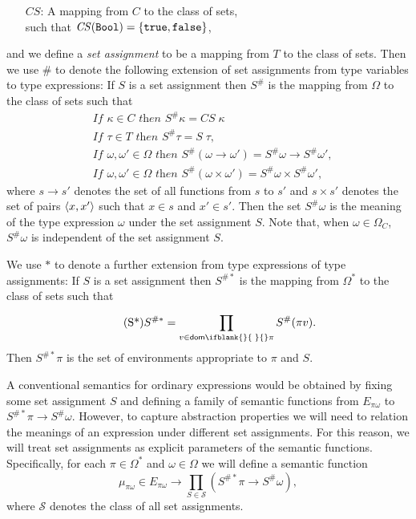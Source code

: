 \documentclass[sigplan,screen,nonacm,balance=false]{acmart}
\theoremstyle{plain}
\DeclarePairedDelimiter{\set}{\{}{\}}
\DeclarePairedDelimiter{\pair}{\langle}{\rangle}
\newcommand{\Bool}{\mathtt{Bool}}
\newcommand{\true}{\mathtt{true}}
\newcommand{\false}{\mathtt{false}}
\newcommand{\dom}[1]{\mathsf{dom}\ifblank{#1}{\;}{#1}}
\newcommand{\CS}{\mathit{CS}}
\begin{document}
\begin{itemize}[noitemsep,leftmargin=3em]
  \item[$\CS$:] A mapping from $C$ to the class of sets, \\
  such that $\CS(\Bool) = \set{\true, \false}$,
\end{itemize}
%
and we define a \emph{set assignment} to be a mapping from $T$ to the class of sets.
Then we use $\#$ to denote the following extension of set assignments from type variables to type expressions:
If $S$ is a set assignment then $S^\#$ is the mapping from $\Omega$ to the class of sets such that
%
\begin{align}
  \tag{S1}
  &\textit{If } \kappa \in C \textit{ then } S^\# \kappa = \CS \; \kappa \\
  \tag{S2}
  &\textit{If } \tau \in T \textit{ then } S^\# \tau = S \; \tau, \\
  \tag{S3}
  &\textit{If } \omega, \omega' \in \Omega \textit{ then } S^\# (\omega \to \omega') = S^\# \omega \to S^\# \omega', \\
  \tag{S4}\label{S4}
  &\textit{If } \omega, \omega' \in \Omega \textit{ then } S^\#(\omega \times \omega') = S^\# \omega \times S^\# \omega',
\end{align}
%
where $s \to s'$ denotes the set of all functions from $s$ to $s'$ and $s \times s'$ denotes the set of pairs $\pair{x, x'}$ such that $x \in s$ and $x' \in s'$.
Then the set $S^\# \omega$ is the meaning of the type expression $\omega$ under the set assignment $S$.
Note that, when $\omega \in \Omega_C$, $S^\# \omega$ is independent of the set assignment $S$.

We use $*$ to denote a further extension from type expressions of type assignments:
If $S$ is a set assignment then $S^{\#*}$ is the mapping from $\Omega^*$ to the class of sets such that
%
\begin{equation}\tag{S*}\label{S-star}
  S^{\#*} = \prod_{v \in \dom{} \pi}^{} S^\#(\pi v).
\end{equation}
%
Then $S^{\#*} \pi$ is the set of environments appropriate to $\pi$ and $S$.

A conventional semantics for ordinary expressions would be obtained by fixing some set assignment $S$ and defining a family of semantic functions from $E_{\pi \omega}$ to $S^{\#*} \pi \to S^{\#} \omega$.
However, to capture abstraction properties we will need to relation the meanings of an expression under different set assignments.
For this reason, we will treat set assignments as explicit parameters of the semantic functions.
Specifically, for each $\pi \in \Omega^*$ and $\omega \in \Omega$ we will define a semantic function
%
\begin{equation*}
  \mu_{\pi \omega} \in E_{\pi \omega} \to \prod_{S \in \mathcal{S}} (S^{\#*} \pi \to S^\# \omega),
\end{equation*}
%
where $\mathcal{S}$ denotes the class of all set assignments.
\end{document}
